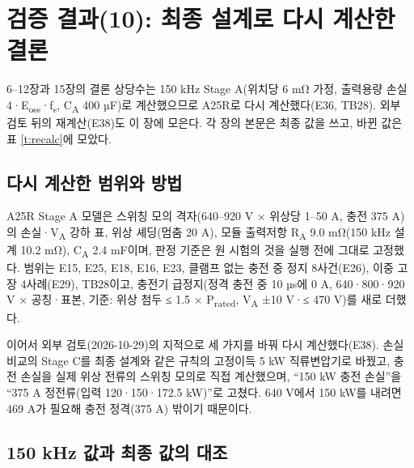 \chapter{검증 결과(10): 최종 설계로 다시 계산한 결론}

6–12장과 15장의 결론 상당수는 150 kHz Stage A(위치당 6 mΩ 가정, 출력용량 손실 4·E\textsubscript{oss}·f\textsubscript{s}, C\textsubscript{A} 400 µF)로 계산했으므로 A25R로 다시 계산했다(E36, TB28). 외부 검토 뒤의 재계산(E38)도 이 장에 모은다. 각 장의 본문은 최종 값을 쓰고, 바뀐 값은 표 \ref{t:recalc}에 모았다.

\section{다시 계산한 범위와 방법}

A25R Stage A 모델은 스위칭 모의 격자(640–920 V × 위상당 1–50 A, 충전 375 A)의 손실·V\textsubscript{A} 강하 표, 위상 셰딩(멈춤 20 A), 모듈 출력저항 R\textsubscript{A} 9.0 mΩ(150 kHz 설계 10.2 mΩ), C\textsubscript{A} 2.4 mF이며, 판정 기준은 원 시험의 것을 실행 전에 그대로 고정했다. 범위는 E15, E25, E18, E16, E23, 클램프 없는 충전 중 정지 8사건(E26), 이중 고장 4사례(E29), TB28이고, 충전기 급정지(정격 충전 중 10 µs에 0 A, 640·800·920 V × 공칭·표본, 기준: 위상 첨두 ≤ 1.5 × P\textsubscript{rated}, V\textsubscript{A} ±10 V·≤ 470 V)를 새로 더했다.


이어서 외부 검토(2026-10-29)의 지적으로 세 가지를 바꿔 다시 계산했다(E38). 손실 비교의 Stage C를 최종 설계와 같은 규칙의 고정이득 5 kW 직류변압기로 바꿨고, 충전 손실을 실제 위상 전류의 스위칭 모의로 직접 계산했으며, “150 kW 충전 손실”을 “375 A 정전류(입력 120·150·172.5 kW)”로 고쳤다. 640 V에서 150 kW를 내려면 469 A가 필요해 충전 정격(375 A) 밖이기 때문이다.

\section{150 kHz 값과 최종 값의 대조}


